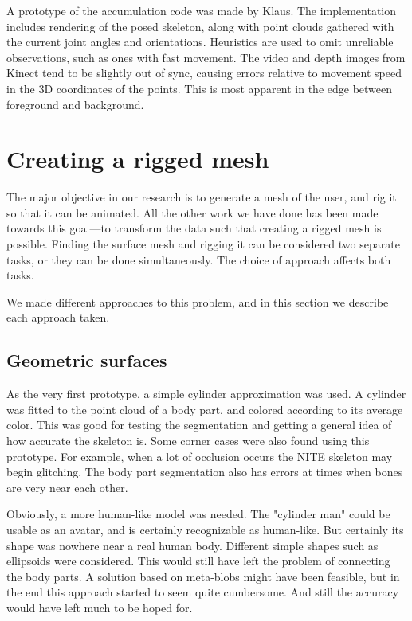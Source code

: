 A prototype of the accumulation code was made by Klaus. The implementation includes rendering of the posed skeleton, along with point clouds gathered with the current joint angles and orientations. Heuristics are used to omit unreliable observations, such as ones with fast movement. The video and depth images from Kinect tend to be slightly out of sync, causing errors relative to movement speed in the 3D coordinates of the points. This is most apparent in the edge between foreground and background.


\section{Creating a rigged mesh}

The major objective in our research is to generate a mesh of the user, and rig it so that it can be animated. All the other work we have done has been made towards this goal---to transform the data such that creating a rigged mesh is possible. Finding the surface mesh and rigging it can be considered two separate tasks, or they can be done simultaneously. The choice of approach affects both tasks.

We made different approaches to this problem, and in this section we describe each approach taken.

\subsection{Geometric surfaces} \label{cylinderman}



As the very first prototype, a simple cylinder approximation was used. A cylinder was fitted to the point cloud of a body part, and colored according to its average color. This was good for testing the segmentation and getting a general idea of how accurate the skeleton is. Some corner cases were also found using this prototype. For example, when a lot of occlusion occurs the NITE skeleton may begin glitching. The body part segmentation also has errors at times when bones are very near each other.

Obviously, a more human-like model was needed. The "cylinder man" could be usable as an avatar, and is certainly recognizable as human-like. But certainly its shape was nowhere near a real human body. Different simple shapes such as ellipsoids were considered. This would still have left the problem of connecting the body parts. A solution based on meta-blobs might have been feasible, but in the end this approach started to seem quite cumbersome. And still the accuracy would have left much to be hoped for.


